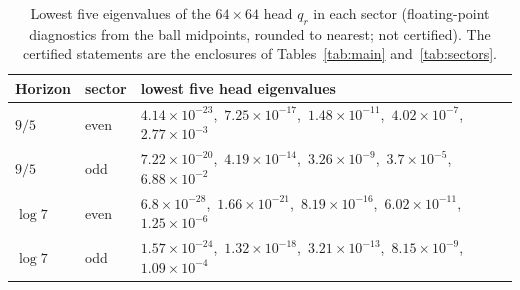 \begin{table}[ht]
\centering
\caption{Lowest five eigenvalues of the $64\times64$ head $q_r$ in each sector (floating-point diagnostics from the ball midpoints, rounded to nearest; not certified). The certified statements are the enclosures of Tables~\ref{tab:main} and~\ref{tab:sectors}.}
\label{tab:spectra}
\small
\begin{tabular}{@{}lll@{}}
\toprule
Horizon & sector & lowest five head eigenvalues\\
\midrule
$9/5$ & even & $4.14\times10^{-23}$,\ $7.25\times10^{-17}$,\ $1.48\times10^{-11}$,\ $4.02\times10^{-7}$,\ $2.77\times10^{-3}$\\
$9/5$ & odd & $7.22\times10^{-20}$,\ $4.19\times10^{-14}$,\ $3.26\times10^{-9}$,\ $3.7\times10^{-5}$,\ $6.88\times10^{-2}$\\
$\log7$ & even & $6.8\times10^{-28}$,\ $1.66\times10^{-21}$,\ $8.19\times10^{-16}$,\ $6.02\times10^{-11}$,\ $1.25\times10^{-6}$\\
$\log7$ & odd & $1.57\times10^{-24}$,\ $1.32\times10^{-18}$,\ $3.21\times10^{-13}$,\ $8.15\times10^{-9}$,\ $1.09\times10^{-4}$\\
\bottomrule
\end{tabular}
\end{table}
